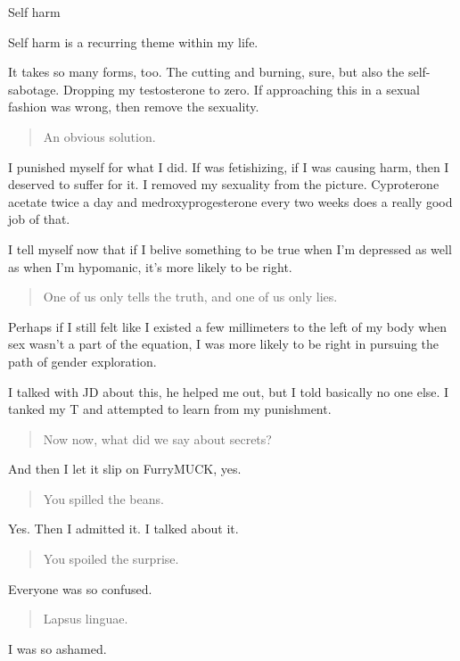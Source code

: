 Self harm

Self harm is a recurring theme within my life.

It takes so many forms, too. The cutting and burning, sure, but also the self-sabotage. Dropping my testosterone to zero. If approaching this in a sexual fashion was wrong, then remove the sexuality.

\begin{quote}
An obvious solution.
\end{quote}

I punished myself for what I did. If was fetishizing, if I was causing harm, then I deserved to suffer for it. I removed my sexuality from the picture. Cyproterone acetate twice a day and medroxyprogesterone every two weeks does a really good job of that.

I tell myself now that if I belive something to be true when I'm depressed as well as when I'm hypomanic, it's more likely to be right.

\begin{quote}
One of us only tells the truth, and one of us only lies.
\end{quote}

Perhaps if I still felt like I existed a few millimeters to the left of my body when sex wasn't a part of the equation, I was more likely to be right in pursuing the path of gender exploration.

I talked with JD about this, he helped me out, but I told basically no one else. I tanked my T and attempted to learn from my punishment.

\begin{quote}
Now now, what did we say about secrets?
\end{quote}

And then I let it slip on FurryMUCK, yes.

\begin{quote}
You spilled the beans.
\end{quote}

Yes. Then I admitted it. I talked about it.

\begin{quote}
You spoiled the surprise.
\end{quote}

Everyone was so confused.

\begin{quote}
Lapsus linguae.
\end{quote}

I was so ashamed.

